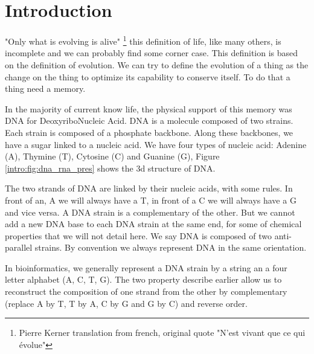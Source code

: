 \documentclass[./main.tex]{subfiles}
\begin{document}
\chapter{Introduction}\label{chapter:introduction}

"Only what is evolving is alive" \footnote{Pierre Kerner translation from french, original quote "N'est vivant que ce qui évolue"} this definition of life, like many others, is incomplete and we can probably find some corner case. This definition is based on the definition of evolution. We can try to define the evolution of a thing as the change on the thing to optimize its capability to conserve itself. To do that a thing need a memory.

In the majority of current know life, the physical support of this memory was DNA for DeoxyriboNucleic Acid. DNA is a molecule composed of two strains. Each strain is composed of a phosphate backbone. Along these backbones, we have a sugar linked to a nucleic acid. We have four types of nucleic acid: Adenine (A), Thymine (T), Cytosine (C) and Guanine (G), Figure \ref{intro:fig:dna_rna_pres} shows the 3d structure of DNA.

The two strands of DNA are linked by their nucleic acids, with some rules. In front of an, A we will always have a T, in front of a C we will always have a G and vice versa. A DNA strain is a complementary of the other. But we cannot add a new DNA base to each DNA strain at the same end, for some of chemical properties that we will not detail here. We say DNA is composed of two anti-parallel strains. By convention we always represent DNA in the same orientation.

In bioinformatics, we generally represent a DNA strain by a string an a four letter alphabet (A, C, T, G). The two property describe earlier allow us to reconstruct the composition of one strand from the other by  complementary (replace A by T, T by A, C by G and G by C) and reverse order.
\end{document}
